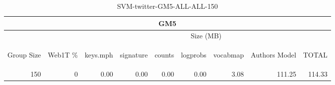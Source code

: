 \begin{center}
\begin{table}[htbp] 
 \begin{center}
\begin{tabular}{ | r | r | r | r | r | r | r | r | r |}
\hline
\multicolumn{9}{|c|}{GM5}\\
\hline
 & & \multicolumn{7}{|c|}{Size (MB)}\\ \cline{3-9}
\begin{sideways}Group Size\end{sideways} & \begin{sideways}Web1T \% \end{sideways} & \begin{sideways}keys.mph\end{sideways} & \begin{sideways}signature\end{sideways} & \begin{sideways}counts\end{sideways} & \begin{sideways}logprobs\end{sideways} & \begin{sideways}vocabmap\end{sideways} & \begin{sideways}Authors Model \end{sideways} & \begin{sideways}TOTAL\end{sideways}\\
\hline
\multirow{0}{*}{150}
 & 0 & 0.00 & 0.00 & 0.00 & 0.00 & 3.08 & 111.25 & 114.33\\ \cline{2-9}
\hline
\end{tabular}
\caption{SVM-twitter-GM5-ALL-ALL-150}
\label{table:SVM-twitter-GM5-ALL-ALL-150}
\end{center}
 \end{table}
\end{center}

